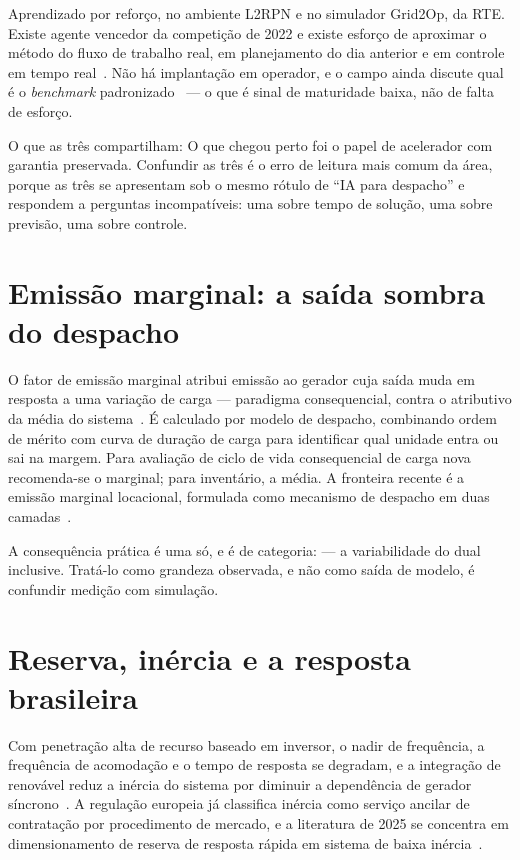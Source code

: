\documentclass[10pt,a4paper,oneside]{book}
\begin{document}
Aprendizado por reforço, no ambiente L2RPN e no simulador Grid2Op, da RTE.
Existe agente vencedor da competição de 2022 e existe esforço de aproximar o
método do fluxo de trabalho real, em planejamento do dia anterior e em controle
em tempo real~\cite{lehna2023}. Não há implantação em operador, e o campo ainda
discute qual é o \emph{benchmark} padronizado~\cite{rl2grid2025} --- o que é
sinal de maturidade baixa, não de falta de esforço.

\vspace{0.6em}
O que as três compartilham:  O que chegou perto foi o papel de
acelerador com garantia preservada. Confundir as três é o erro de leitura mais
comum da área, porque as três se apresentam sob o mesmo rótulo de ``IA para
despacho'' e respondem a perguntas incompatíveis: uma sobre tempo de solução,
uma sobre previsão, uma sobre controle.

\section*{Emissão marginal: a saída sombra do despacho}

O fator de emissão marginal atribui emissão ao gerador cuja saída muda em
resposta a uma variação de carga --- paradigma consequencial, contra o
atributivo da média do sistema~\cite{emaps2025}. É calculado por modelo de
despacho, combinando ordem de mérito com curva de duração de carga para
identificar qual unidade entra ou sai na margem. Para avaliação de ciclo de vida
consequencial de carga nova recomenda-se o marginal; para inventário, a média.
A fronteira recente é a emissão marginal locacional, formulada como mecanismo de
despacho em duas camadas~\cite{cote2026}.

A consequência prática é uma só, e é de categoria:  --- a
variabilidade do dual inclusive. Tratá-lo como grandeza observada, e não como
saída de modelo, é confundir medição com simulação.

\section*{Reserva, inércia e a resposta brasileira}

Com penetração alta de recurso baseado em inversor, o nadir de frequência, a
frequência de acomodação e o tempo de resposta se degradam, e a integração de
renovável reduz a inércia do sistema por diminuir a dependência de gerador
síncrono~\cite{smahi2025}. A regulação europeia já classifica inércia como
serviço ancilar de contratação por procedimento de mercado, e a literatura de
2025 se concentra em dimensionamento de reserva de resposta rápida em sistema de
baixa inércia~\cite{panagi2025}.
\end{document}
